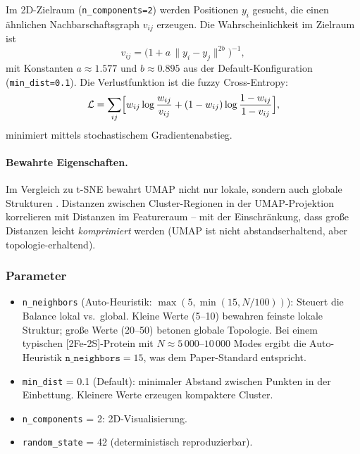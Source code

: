 \documentclass[11pt,a4paper,twoside]{article}
\theoremstyle{remark}
\begin{document}
Im 2D-Zielraum (\texttt{n\_components=2}) werden Positionen $y_i$
gesucht, die einen \"ahnlichen Nachbarschaftsgraph $v_{ij}$ erzeugen.
Die Wahrscheinlichkeit im Zielraum ist
\begin{equation}
  v_{ij} = \bigl(1 + a\,\|y_i - y_j\|^{2b}\bigr)^{-1},
\end{equation}
mit Konstanten $a \approx 1.577$ und $b \approx 0.895$ aus der
Default-Konfiguration (\texttt{min\_dist=0.1}). Die Verlustfunktion
ist die fuzzy Cross-Entropy:
\begin{equation}
  \mathcal{L} = \sum_{ij} \Bigl[w_{ij}\log\frac{w_{ij}}{v_{ij}}
              + (1 - w_{ij})\log\frac{1 - w_{ij}}{1 - v_{ij}}\Bigr],
  \label{eq:umap-loss}
\end{equation}
minimiert mittels stochastischem Gradientenabstieg.

\paragraph{Bewahrte Eigenschaften.}

Im Vergleich zu t-SNE bewahrt UMAP nicht nur lokale, sondern auch
globale Strukturen \cite{Becht2019}. Distanzen zwischen
Cluster-Regionen in der UMAP-Projektion korrelieren mit Distanzen im
Featureraum -- mit der Einschr\"ankung, dass gro\ss e Distanzen leicht
\emph{komprimiert} werden (UMAP ist nicht abstandserhaltend, aber
topologie-erhaltend).

\subsubsection*{Parameter}

\begin{itemize}
  \item \texttt{n\_neighbors} (Auto-Heuristik:
        $\max(5, \min(15, N/100))$): Steuert die Balance lokal vs.\
        global. Kleine Werte (5--10) bewahren feinste lokale Struktur;
        gro\ss e Werte (20--50) betonen globale Topologie. Bei einem
        typischen [2Fe-2S]-Protein mit $N \approx 5\,000$--$10\,000$ Modes ergibt die
        Auto-Heuristik $\texttt{n\_neighbors} = 15$, was dem
        Paper-Standard \cite{McInnes2018} entspricht.

  \item \texttt{min\_dist} = 0.1 (Default): minimaler Abstand
        zwischen Punkten in der Einbettung. Kleinere Werte erzeugen
        kompaktere Cluster.

  \item \texttt{n\_components} = 2: 2D-Visualisierung.

  \item \texttt{random\_state} = 42 (deterministisch reproduzierbar).
\end{itemize}
\end{document}
